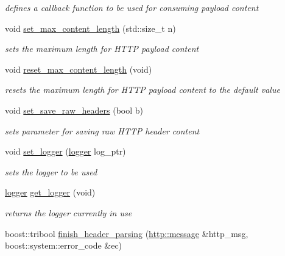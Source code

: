 \begin{DoxyCompactItemize}
\begin{DoxyCompactList}\small\item\em defines a callback function to be used for consuming payload content \end{DoxyCompactList}\item 
void \hyperlink{classpion_1_1http_1_1parser_a6533144b6f6d1e93dd000360748ac271}{set\-\_\-max\-\_\-content\-\_\-length} (std\-::size\-\_\-t n)
\begin{DoxyCompactList}\small\item\em sets the maximum length for H\-T\-T\-P payload content \end{DoxyCompactList}\item 
void \hyperlink{classpion_1_1http_1_1parser_a8834a77e417b4127bdda4fa79ff5fe59}{reset\-\_\-max\-\_\-content\-\_\-length} (void)
\begin{DoxyCompactList}\small\item\em resets the maximum length for H\-T\-T\-P payload content to the default value \end{DoxyCompactList}\item 
void \hyperlink{classpion_1_1http_1_1parser_a06b96d27daaea9ae3dd15f188e01f70b}{set\-\_\-save\-\_\-raw\-\_\-headers} (bool b)
\begin{DoxyCompactList}\small\item\em sets parameter for saving raw H\-T\-T\-P header content \end{DoxyCompactList}\item 
void \hyperlink{classpion_1_1http_1_1parser_a3f93047d2f938a845967d22073122311}{set\-\_\-logger} (\hyperlink{structpion_1_1logger}{logger} log\-\_\-ptr)
\begin{DoxyCompactList}\small\item\em sets the logger to be used \end{DoxyCompactList}\item 
\hyperlink{structpion_1_1logger}{logger} \hyperlink{classpion_1_1http_1_1parser_ad799af46a7b4e3f1e27c047f76849d77}{get\-\_\-logger} (void)
\begin{DoxyCompactList}\small\item\em returns the logger currently in use \end{DoxyCompactList}\item 
boost\-::tribool \hyperlink{classpion_1_1http_1_1parser_ac707ec5cecacf3b56c151e6891c5cf9d}{finish\-\_\-header\-\_\-parsing} (\hyperlink{classpion_1_1http_1_1message}{http\-::message} \&http\-\_\-msg, boost\-::system\-::error\-\_\-code \&ec)
\end{DoxyCompactItemize}
